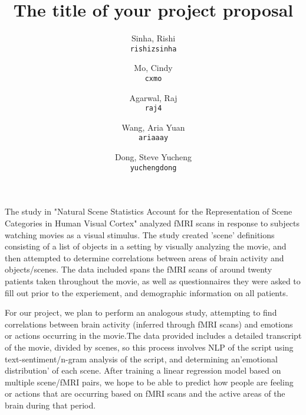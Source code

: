 \documentclass[11pt]{article}
\title{The title of your project proposal}
\author{
  Sinha, Rishi\\
  \texttt{rishizsinha}
  \and
  Mo, Cindy\\
  \texttt{cxmo}
  \and
  Agarwal, Raj\\
  \texttt{raj4}
  \and
  Wang, Aria Yuan\\
  \texttt{ariaaay}
  \and
  Dong, Steve Yucheng\\
  \texttt{yuchengdong}
}
\begin{document}
\maketitle

The study in "Natural Scene Statistics Account for the Representation of 
Scene Categories in Human Visual Cortex"\cite{stansbury2013neuron} analyzed 
fMRI scans in response to subjects watching movies as a visual stimulus.
The study created 'scene' definitions consisting of a list of objects in 
a setting by visually analyzing the movie, and then attempted to determine 
correlations between areas of brain activity and objects/scenes. The data 
included spans the fMRI scans of around twenty patients taken throughout
the movie, as well as questionnaires they were asked to fill out prior
to the experiement, and demographic information on all patients.

For our project, we plan to perform an analogous study, attempting to find
correlations between brain activity (inferred through fMRI scans) and 
emotions or actions occurring in the movie.The data provided includes 
a detailed transcript of the movie, divided by scenes, so this process 
involves NLP of the script using text-sentiment/n-gram analysis of the 
script, and determining an'emotional distribution' of each scene. After 
training a linear regression model based on multiple scene/fMRI pairs, we 
hope to be able to predict how people are feeling or actions that are 
occurring based on fMRI scans and the active areas of the brain during that 
period. 


\end{document}
